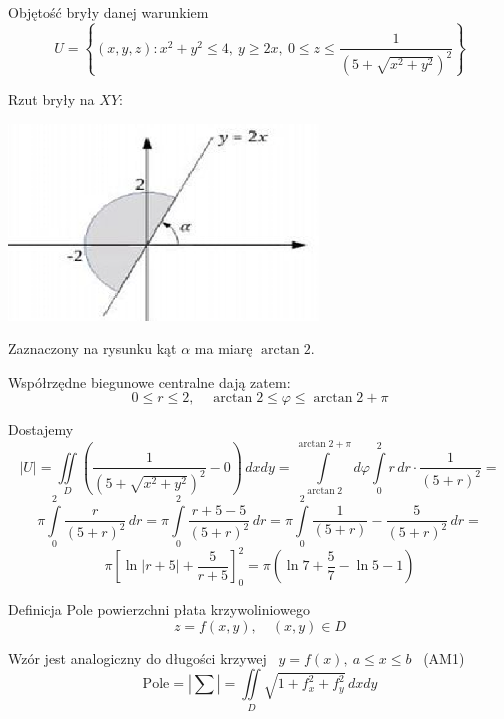 \begin{przyklad}
    Objętość bryły danej warunkiem
    \[ U = \left\{ (x,y,z): x^2 + y^2 \leq 4, \ y \geq 2x, \ 0 \leq z \leq \frac{1}{(5 + \sqrt{x^2 + y^2})^2} \right\} \]

    Rzut bryły na $XY$:

    \begin{center}
        \includegraphics[scale=0.5]{img/rzutbrylyXY.png}
    \end{center}

    Zaznaczony na rysunku kąt $\alpha$ ma miarę $\arctan 2$.

    Współrzędne biegunowe centralne dają zatem:
    \[ 0 \leq r \leq 2, \quad \arctan 2 \leq \varphi \leq \arctan 2 + \pi \]

    Dostajemy
    \[ |U| = \iint\limits_D \left( \frac{1}{\left( 5 + \sqrt{x^2 + y^2}\right)^2} - 0 \right) \, dxdy = 
    \int\limits_{\arctan 2}^{\arctan 2 + \pi} d\varphi \int\limits_{0}^{2} r \, dr \cdot \frac{1}{(5 + r)^2} = \]
    \[ \pi \int\limits_{0}^{2} \frac{r}{(5+r)^2} \, dr = \pi \int\limits_{0}^{2} \frac{r + 5 - 5}{(5 + r)^2} \, dr = 
    \pi \int\limits_{0}^{2} \frac{1}{(5+r)} - \frac{5}{(5+r)^2} \, dr = \] 
    \[ \pi \left[ \ln |r + 5| + \frac{5}{r + 5} \right]_{0}^{2} = \pi \left( \ln 7 + \frac{5}{7} - \ln 5 - 1 \right) \]
\end{przyklad}

\begin{tw}{Definicja}
    Pole powierzchni płata krzywoliniowego
    \[ z = f(x,y), \quad (x,y) \in D \]

    Wzór jest analogiczny do długości krzywej \ $ y = f(x), \ a \leq x \leq b $ \ (AM1)
    \[ \text{Pole} = |\sum| = \iint\limits_D \sqrt{1 + f_x^2 + f_y^2} \, dxdy \]
\end{tw}

